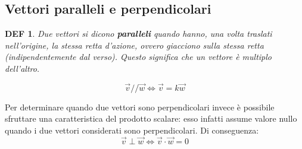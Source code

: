 \documentclass{article}     %
\newcommand\parallelo{/\!/} %
\newtheorem*{definition}{DEF}
\begin{document}
        \subsection{Vettori paralleli e perpendicolari}
            \begin{definition}
                Due vettori si dicono \textbf{paralleli} quando hanno, una volta traslati nell'origine, la stessa retta d'azione, ovvero giacciono sulla stessa retta (indipendentemente dal verso). Questo significa che un vettore è multiplo dell'altro. 
                
                \[\overrightarrow{v}\parallelo\overrightarrow{w}\Leftrightarrow \overrightarrow{v}=k\overrightarrow{w}\]
            \end{definition}
            
            Per determinare quando due vettori sono perpendicolari invece è possibile sfruttare una caratteristica del prodotto scalare: esso infatti assume valore nullo quando i due vettori considerati sono perpendicolari. Di conseguenza:
            \[\overrightarrow{v}\perp\overrightarrow{w}\Leftrightarrow \overrightarrow{v}\cdot\overrightarrow{w}=0\]
\end{document}
